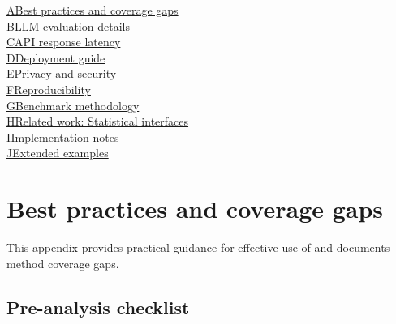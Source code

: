 \noindent\hyperref[app:best-practices]{A\hspace{1em}Best practices and coverage gaps}\\
\noindent\hyperref[app:llm-eval]{B\hspace{1em}LLM evaluation details}\\
\noindent\hyperref[app:latency]{C\hspace{1em}API response latency}\\
\noindent\hyperref[app:deployment]{D\hspace{1em}Deployment guide}\\
\noindent\hyperref[app:privacy]{E\hspace{1em}Privacy and security}\\
\noindent\hyperref[app:reproducibility]{F\hspace{1em}Reproducibility}\\
\noindent\hyperref[app:benchmark-methodology]{G\hspace{1em}Benchmark methodology}\\
\noindent\hyperref[app:related-work]{H\hspace{1em}Related work: Statistical interfaces}\\
\noindent\hyperref[app:implementation]{I\hspace{1em}Implementation notes}\\
\noindent\hyperref[app:extended-examples]{J\hspace{1em}Extended examples}

\vspace{2em}

\section{Best practices and coverage gaps} \label{app:best-practices}
\setcounter{table}{0}
\setcounter{figure}{0}

This appendix provides practical guidance for effective use of
 and documents method coverage gaps.

\subsection{Pre-analysis checklist}

